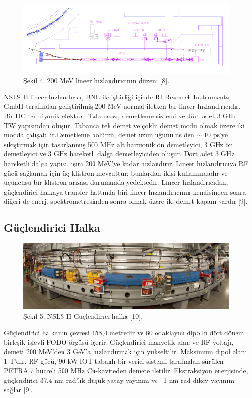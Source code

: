 \documentclass{article}
\begin{document}
	\begin{figure}[h]
 \centering
\includegraphics[width=12cm]{linacss.png}
\caption*{Şekil 4. 200 MeV lineer hızlandırıcının düzeni [8].}
	\end{figure}
	
NSLS-II lineer hızlandırıcı, BNL ile işbirliği içinde RI Research Instruments, GmbH tarafından geliştirilmiş 200 MeV normal iletken bir lineer hızlandırıcıdır. Bir DC termiyonik elektron Tabancası, demetleme sistemi ve dört adet 3 GHz TW yapısından oluşur. Tabanca tek demet ve çoklu demet modu olmak üzere iki modda çalışabilir.Demetleme bölümü, demet uzunluğunu ns'den $\sim$ 10 ps'ye sıkıştırmak için tasarlanmış 500 MHz alt harmonik ön demetleyici, 3 GHz ön demetleyici ve 3 GHz hareketli dalga demetleyiciden oluşur. Dört adet 3 GHz hareketli dalga yapısı, ışını 200 MeV'ye kadar hızlandırır. Lineer hızlandırıcıya RF gücü sağlamak için üç klistron mevcuttur; bunlardan ikisi kullanımdadır ve üçüncüsü bir klistron arızası durumunda yedektedir. Lineer hızlandırıcıdan, güçlendirici halkaya transfer hattında biri lineer hızlandırıcının kendisinden sonra diğeri de enerji spektrometresinden sonra olmak üzere iki demet kapanı vardır [9].


\subsection{Güçlendirici Halka}

			\begin{figure}[h]
 \centering
\includegraphics[width=12cm]{booster.png}
\caption*{Şekil 5. NSLS-II Güçlendirici halka [10].}
	\end{figure}
	
Güçlendirici halkanın çevresi 158,4 metredir ve 60 odaklayıcı dipollü dört dönem birleşik işlevli FODO örgüsü içerir. Güçlendirici manyetik alan ve RF voltajı, demeti 200 MeV'den 3 GeV'a hızlandırmak için yükseltilir. Maksimum dipol alanı 1 T'dır. RF gücü, 90 kW IOT tabanlı bir verici sistemi tarafından sürülen PETRA 7 hücreli 500 MHz Cu-kaviteden demete iletilir. Ekstraksiyon enerjisinde, güçlendirici 37.4 nm-rad'lık düşük yatay yayınım ve ~1 nm-rad dikey yayınım sağlar [9].
\end{document}
